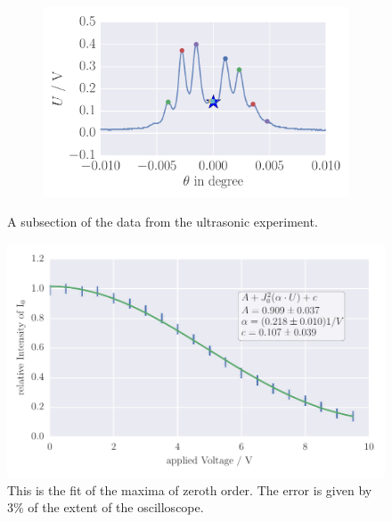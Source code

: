 \begin{figure}
\begin{subfigure}[b]{\picwidth}
        \caption{}
        \label{fig:raman_014}
    \end{subfigure}
    \begin{subfigure}[b]{\picwidth}
        \includegraphics[width=1.2\textwidth]{analysis/figures/raman_020}
        \caption{}
        \label{fig:raman_020}
    \end{subfigure}
    \caption{A subsection of the data from the ultrasonic experiment.}\label{fig:raman}
\end{figure}
\begin{figure}[htpb]
    \centering
    \includegraphics[width=1\textwidth]{analysis/figures/besselfit_0}
    \caption{This is the fit of the maxima of zeroth order. The error is given by 3\% of the extent of the oscilloscope.}
    \label{fig:besselfit_0}
\end{figure}

